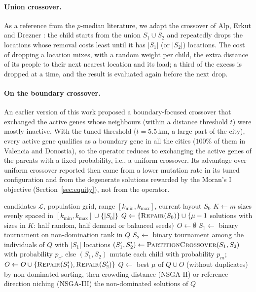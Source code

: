 \paragraph{Union crossover.}
As a reference from the $p$-median literature, we adapt the crossover of Alp, Erkut and Drezner \cite{alp2003efficient}: the child starts from the union $S_1 \cup S_2$ and repeatedly drops the locations whose removal costs least until it has $|S_1|$ (or $|S_2|$) locations. The cost of dropping a location mixes, with a random weight per child, the extra distance of its people to their next nearest location and its load; a third of the excess is dropped at a time, and the result is evaluated again before the next drop.

\paragraph{On the boundary crossover.}
An earlier version of this work proposed a boundary-focused crossover that exchanged the active genes whose neighbours (within a distance threshold $t$) were mostly inactive. With the tuned threshold ($t = 5.5$\,km, a large part of the city), every active gene qualifies as a boundary gene in all the cities ($100\%$ of them in Valencia and Donostia), so the operator reduces to exchanging the active genes of the parents with a fixed probability, i.e., a uniform crossover. Its advantage over uniform crossover reported then came from a lower mutation rate in its tuned configuration and from the degenerate solutions rewarded by the Moran's I objective (Section~\ref{sec:equity}), not from the operator.

\begin{algorithm}[t]
\caption{NSGA-II/III for UCO container placement}
\label{alg:nsga}
\begin{algorithmic}[1]
\Require candidates $\mathcal{L}$, population grid, range $[k_{\min}, k_{\max}]$, current layout $S_0$
\State $K \gets m$ sizes evenly spaced in $[k_{\min}, k_{\max}] \cup \{|S_0|\}$
\State $Q \gets \{\textsc{Repair}(S_0)\} \cup \{\mu - 1$ solutions with sizes in $K$: half random, half demand or balanced seeds$\}$
    \State $O \gets \emptyset$
        \State $S_1 \gets$ binary tournament on non-domination rank in $Q$
        \State $S_2 \gets$ binary tournament among the individuals of $Q$ with $|S_1|$ locations
        \State $(S'_1, S'_2) \gets \textsc{PartitionCrossover}(S_1, S_2)$ with probability $p_c$, else $(S_1, S_2)$
        \State mutate each child with probability $p_m$; $O \gets O \cup \{\textsc{Repair}(S'_1), \textsc{Repair}(S'_2)\}$
    \EndWhile
    \State $Q \gets$ best $\mu$ of $Q \cup O$ (without duplicates) by non-dominated sorting, then crowding distance (NSGA-II) or reference-direction niching (NSGA-III)
\EndFor
\State \Return the non-dominated solutions of $Q$
\end{algorithmic}
\end{algorithm}
